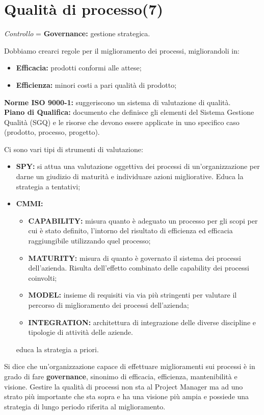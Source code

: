 



\section{Qualità di processo(7)}
\textit{Controllo} = \textbf{Governance:} gestione strategica.

Dobbiamo crearci regole per il miglioramento dei processi, migliorandoli in:
\begin{itemize}
	\item \textbf{Efficacia:} prodotti conformi alle attese;
	\item \textbf{Efficienza:} minori costi a pari qualità di prodotto; 
\end{itemize} 

\textbf{Norme ISO 9000-1:} suggeriscono un sistema di valutazione di qualità.\\
\textbf{Piano di Qualifica:} documento che definisce gli elementi del Sistema Gestione Qualità (SGQ) e le risorse che devono essere applicate in uno specifico caso (prodotto, processo, progetto).

Ci sono vari tipi di strumenti di valutazione:
\begin{itemize}
	\item \textbf{SPY:} si attua una valutazione oggettiva dei processi di un'organizzazione per darne un giudizio di maturità e individuare azioni migliorative. Educa la strategia a tentativi;
 	\item \textbf{CMMI:}
 		\begin{itemize}
 			\item \textbf{CAPABILITY:} misura quanto è adeguato un processo per gli scopi per cui è stato definito, l'intorno del risultato di efficienza ed efficacia raggiungibile utilizzando quel processo;
 			\item \textbf{MATURITY:} misura di quanto è governato il sistema dei processi dell'azienda. Risulta dell'effetto combinato delle capability dei processi coinvolti;
 			\item \textbf{MODEL:} insieme di requisiti via via più stringenti per valutare il percorso di miglioramento dei processi dell'azienda;
 			\item \textbf{INTEGRATION:} architettura di integrazione delle diverse discipline e tipologie di attività delle aziende.
 		\end{itemize}
 		educa la strategia a priori.
	
\end{itemize} 
Si dice che un'organizzazione capace di effettuare miglioramenti sui processi è in grado di fare \textbf{governance}, sinonimo di efficacia, efficienza, mantenibilità e visione. Gestire la qualità di processi non sta al Project Manager ma ad uno strato più importante che sta sopra e ha una visione più ampia e possiede una strategia di lungo periodo riferita al miglioramento.

